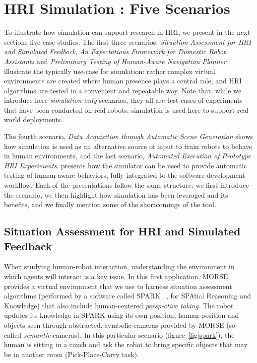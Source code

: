 \documentclass{llncs}
\begin{document}
\section{HRI Simulation : Five Scenarios}

To illustrate how simulation can support research in HRI, we present in the next
sections five case-studies.  The first three scenarios, \emph{Situation
Assessment for HRI and Simulated Feedback}, \emph{An Expectations Framework for
Domestic Robot Assistants} and \emph{Preliminary Testing of Human-Aware
Navigation Planner} illustrate the typically use-case for simulation: rather
complex virtual environments are created where human presence plays a
central role, and HRI algorithms are tested in a convenient and repeatable way.
Note that, while we introduce here \emph{simulation-only} scenarios, they all
are test-cases of experiments that have been conducted on real robots:
simulation is used here to support real-world deployments.

The fourth scenario, \emph{Data Acquisition through Automatic Scene Generation}
shows how simulation is used as an alternative source of input to train robots to
behave in human environments, and the last scenario, \emph{Automated Execution
of Prototype HRI Experiments}, presents how the simulator can be used to provide
automatic testing of human-aware behaviors, fully integrated to the software
development workflow. Each of the presentations follow the same structure: we
first introduce the scenario, we then highlight how simulation has been leveraged
and its benefits, and we finally mention some of the shortcomings of the tool.

\subsection{Situation Assessment for HRI and Simulated Feedback}
\label{sc:assessment}

When studying human-robot interaction, understanding the environment in which
agents will interact is a key issue. In this first application, MORSE provides a
virtual environment that we use to harness situation assessment algorithms
(performed by a software called SPARK ~\cite{Milliez2014}, for SPAtial
Reasoning and Knowledge) that also include human-centered \emph{perspective
taking}. The robot updates its knowledge in SPARK using its own position, human
position and objects seen through abstracted, symbolic cameras provided by MORSE
(so-called \emph{semantic} cameras). In this particular scenario
(figure~\ref{fig|spark}), the human is sitting in a couch and ask the robot to
bring specific objects that may be in another room (Pick-Place-Carry task).
\end{document}
